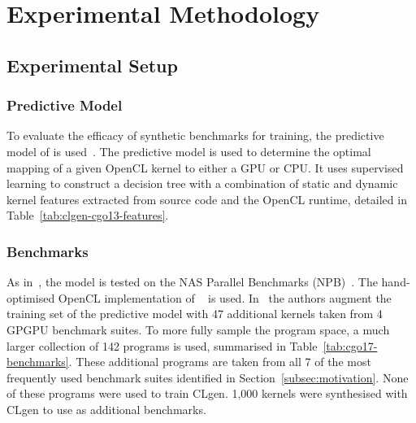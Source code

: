 \section{Experimental Methodology}
\label{sec:clgen-eval-methodology}

\subsection{Experimental Setup}

\subsubsection{Predictive Model}

To evaluate the efficacy of synthetic benchmarks for training, the predictive model of \citeauthor{Grewe2013} is used~\cite{Grewe2013}. The predictive model is used to determine the optimal mapping of a given OpenCL kernel to either a GPU or CPU. It uses supervised learning to construct a decision tree with a combination of static and dynamic kernel features extracted from source code and the OpenCL runtime, detailed in Table~\ref{tab:clgen-cgo13-features}.

\begin{table}
	\centering%
	\caption[\emph{Grewe et al.\ }features for heterogeneous device mapping]{%
		Features used by \emph{Grewe et al.\ }to predict CPU/GPU mapping of OpenCL kernels. The features are extracted using a custom analysis pass based using LLVM.
	}%
	\label{tab:clgen-cgo13-features} %
\end{table}

\subsubsection{Benchmarks}

As in~\cite{Grewe2013}, the model is tested on the NAS Parallel Benchmarks (NPB)~\cite{Bailey1991a}. The hand-optimised OpenCL implementation of \citeauthor{Seo2011}~\cite{Seo2011} is used. In~\cite{Grewe2013} the authors augment the training set of the predictive model with 47 additional kernels taken from 4 GPGPU benchmark suites. To more fully sample the program space, a much larger collection of 142 programs is used, summarised in Table~\ref{tab:cgo17-benchmarks}. These additional programs are taken from all 7 of the most frequently used benchmark suites identified in Section~\ref{subsec:motivation}. None of these programs were used to train CLgen. 1,000 kernels were synthesised with CLgen to use as additional benchmarks.

